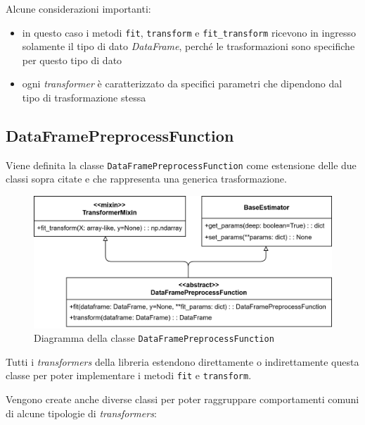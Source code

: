 Alcune considerazioni importanti:

\begin{itemize}
    \item in questo caso i metodi \texttt{fit}, \texttt{transform} e \texttt{fit\_transform} ricevono in ingresso solamente il tipo di dato \textit{DataFrame}, perché le trasformazioni sono specifiche per questo tipo di dato
    \item ogni \textit{transformer} è caratterizzato da specifici parametri che dipendono dal tipo di trasformazione stessa
\end{itemize}

\subsection{DataFramePreprocessFunction}

Viene definita la classe \texttt{DataFramePreprocessFunction} come estensione delle due classi sopra citate e che rappresenta una generica trasformazione.

\begin{figure}[H]
    \centering
    \includegraphics[scale=0.2]{figures/UML/preprocessing/dataframe_preprocess_function.png}
    \caption{Diagramma della classe \texttt{DataFramePreprocessFunction}}
\end{figure}

Tutti i \textit{transformers} della libreria estendono direttamente o indirettamente questa classe per poter implementare i metodi \texttt{fit} e \texttt{transform}. 

Vengono create anche diverse classi per poter raggruppare comportamenti comuni di alcune tipologie di \textit{transformers}:

